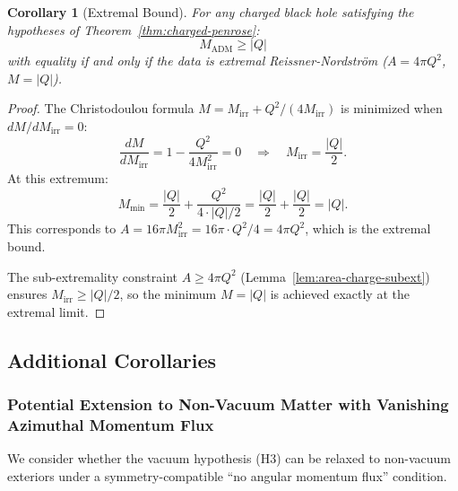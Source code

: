 \documentclass[12pt]{article}
\theoremstyle{plain}
\newtheorem{corollary}[theorem]{Corollary}
\theoremstyle{definition}
\theoremstyle{remark}
\newcommand{\ADM}{\mathrm{ADM}}
\begin{document}
\begin{corollary}[Extremal Bound]\label{cor:extremal-bound}
For any charged black hole satisfying the hypotheses of Theorem~\ref{thm:charged-penrose}:
\begin{equation}
    M_{\ADM} \geq |Q|
\end{equation}
with equality if and only if the data is extremal Reissner-Nordstr\"om ($A = 4\pi Q^2$, $M = |Q|$).
\end{corollary}

\begin{proof}
The Christodoulou formula $M = M_{\mathrm{irr}} + Q^2/(4M_{\mathrm{irr}})$ is minimized when $dM/dM_{\mathrm{irr}} = 0$:
\[
\frac{dM}{dM_{\mathrm{irr}}} = 1 - \frac{Q^2}{4M_{\mathrm{irr}}^2} = 0 \quad \Rightarrow \quad M_{\mathrm{irr}} = \frac{|Q|}{2}.
\]
At this extremum:
\[
M_{\min} = \frac{|Q|}{2} + \frac{Q^2}{4 \cdot |Q|/2} = \frac{|Q|}{2} + \frac{|Q|}{2} = |Q|.
\]
This corresponds to $A = 16\pi M_{\mathrm{irr}}^2 = 16\pi \cdot Q^2/4 = 4\pi Q^2$, which is the extremal bound.

The sub-extremality constraint $A \geq 4\pi Q^2$ (Lemma~\ref{lem:area-charge-subext}) ensures $M_{\mathrm{irr}} \geq |Q|/2$, so the minimum $M = |Q|$ is achieved exactly at the extremal limit.
\end{proof}

\subsection{Additional Corollaries}\label{subsec:corollaries}

\subsubsection{Potential Extension to Non-Vacuum Matter with Vanishing Azimuthal Momentum Flux}

We consider whether the vacuum hypothesis (H3) can be relaxed to non-vacuum exteriors under a symmetry-compatible ``no angular momentum flux'' condition.
\end{document}
